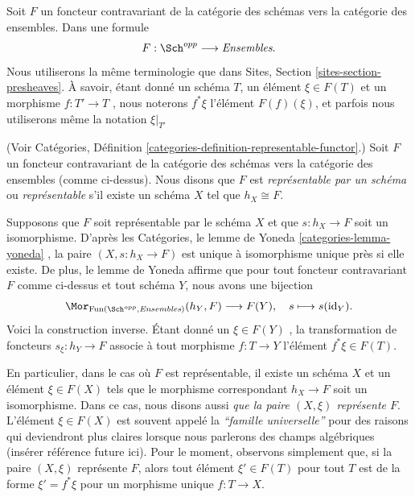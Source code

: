 \medskip\noindent
Soit  $F$  un foncteur contravariant de la catégorie des schémas vers la
catégorie des ensembles. Dans une formule
$$
F : \Sch^{opp}
\longrightarrow
\textit{Ensembles}.
$$
Nous utiliserons la même terminologie que dans Sites, Section  \ref{sites-section-presheaves}. À
savoir, étant donné un schéma  $T$, un élément  $\xi \in F(T)$ et un
morphisme  $f : T' \to T$ , nous noterons  $f^*\xi$  l'élément  $F(f)(\xi)$, et
parfois nous utiliserons même la notation  $\xi|_{T'}$

\begin{definition}
\label{definition-representable-functor}
(Voir Catégories, Définition  \ref{categories-definition-representable-functor}.) Soit  $F$  un foncteur
contravariant de la catégorie des schémas vers la catégorie des ensembles (comme
ci-dessus). Nous disons que  $F$  est  {\it 
représentable par un schéma }  ou  {\it  représentable
}  s'il existe un schéma  $X$  tel que  $h_X \cong F$.
\end{definition}

\noindent
Supposons que  $F$  soit représentable par le schéma  $X$  et que
 $s : h_X \to F$  soit un isomorphisme. D'après les Catégories, le lemme de Yoneda
 \ref{categories-lemma-yoneda} , la paire  $(X, s : h_X \to F)$  est unique à isomorphisme unique près si elle
existe. De plus, le lemme de Yoneda affirme que pour tout foncteur contravariant
 $F$  comme ci-dessus et tout schéma  $Y$, nous avons une bijection
$$
\Mor_{\text{Fun}(\Sch^{opp}, \textit{Ensembles})} (h_Y, F)
\longrightarrow
F(Y), \quad
s \longmapsto s(\text{id}_Y).
$$
Voici la construction inverse. Étant donné un  $\xi \in F(Y)$ , la transformation de
foncteurs  $s_\xi : h_Y \to F$  associe à tout morphisme  $f : T \to Y$  l'élément
 $f^*\xi \in F(T)$.

\medskip\noindent
En particulier, dans le cas où  $F$  est représentable, il existe un schéma
 $X$  et un élément  $\xi \in F(X)$  tels que le morphisme correspondant
 $h_X \to F$  soit un isomorphisme. Dans ce cas, nous disons aussi
 {\it  que la paire  $(X, \xi)$  représente
 $F$}. L'élément  $\xi \in F(X)$  est souvent appelé la
 {\it  ``famille universelle'' }  pour des raisons qui
deviendront plus claires lorsque nous parlerons des champs algébriques (insérer
référence future ici). Pour le moment, observons simplement que, si la paire
 $(X, \xi)$  représente  $F$, alors tout élément  $\xi' \in F(T)$ 
pour tout  $T$  est de la forme  $\xi' = f^*\xi$  pour un morphisme unique
 $f : T \to X$.

